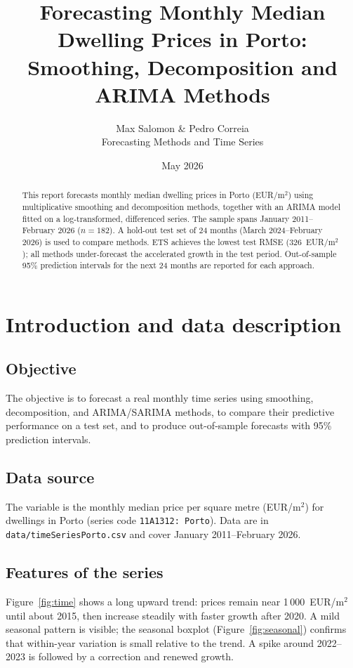 \documentclass[11pt,a4paper]{article}
\title{Forecasting Monthly Median Dwelling Prices in Porto:\\
Smoothing, Decomposition and ARIMA Methods}
\author{Max Salomon \& Pedro Correia\\[0.4em]\small Forecasting Methods and Time Series}
\date{May 2026}
\begin{document}
\maketitle

\begin{abstract}
This report forecasts monthly median dwelling prices in Porto (EUR/m$^2$) using multiplicative smoothing and decomposition methods, together with an ARIMA model fitted on a log-transformed, differenced series. The sample spans January 2011--February 2026 ($n=182$). A hold-out test set of 24 months (March 2024--February 2026) is used to compare methods. ETS achieves the lowest test RMSE (326~EUR/m$^2$); all methods under-forecast the accelerated growth in the test period. Out-of-sample 95\% prediction intervals for the next 24 months are reported for each approach.
\end{abstract}

\tableofcontents
\newpage

\section{Introduction and data description}

\subsection{Objective}

The objective is to forecast a real monthly time series using smoothing, decomposition, and ARIMA/SARIMA methods, to compare their predictive performance on a test set, and to produce out-of-sample forecasts with 95\% prediction intervals.

\subsection{Data source}

The variable is the monthly median price per square metre (EUR/m$^2$) for dwellings in Porto (series code \texttt{11A1312: Porto}). Data are in \texttt{data/timeSeriesPorto.csv} and cover January 2011--February 2026.

\subsection{Features of the series}

Figure~\ref{fig:time} shows a long upward trend: prices remain near 1\,000~EUR/m$^2$ until about 2015, then increase steadily with faster growth after 2020. A mild seasonal pattern is visible; the seasonal boxplot (Figure~\ref{fig:seasonal}) confirms that within-year variation is small relative to the trend. A spike around 2022--2023 is followed by a correction and renewed growth.
\end{document}

